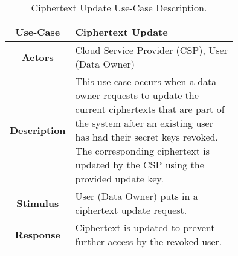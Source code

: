 \begin{table}[]
	\centering
	\begin{tabular}{|c|p{0.75\linewidth}|}
		\hline
		\textbf{Use-Case}    & Ciphertext Update                                  \\ \hline
		\textbf{Actors}      & Cloud Service Provider (CSP), User (Data Owner)                         \\ \hline
		\textbf{Description} & This use case occurs when a data owner requests to update the current ciphertexts that are part of the system after an existing user has had their secret keys revoked. The corresponding ciphertext is updated by the CSP using the provided update key. \\ \hline
		\textbf{Stimulus}    & User (Data Owner) puts in a ciphertext update request.                   \\ \hline
		\textbf{Response}    & Ciphertext is updated to prevent further access by the revoked user.             \\ \hline
	\end{tabular}
	\caption{Ciphertext Update Use-Case Description.}
	\label{tab:use_case_ctupd}
\end{table}



